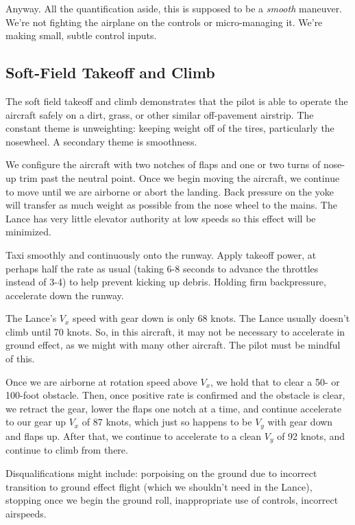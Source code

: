Anyway. All the quantification aside, this is supposed to be a \emph{smooth} maneuver. We're not fighting the airplane on the controls or micro-managing it. We're making small, subtle control inputs.

\subsection{Soft-Field Takeoff and Climb}

The soft field takeoff and climb demonstrates that the pilot is able to operate the aircraft safely on a dirt, grass, or other similar off-pavement airstrip. The constant theme is unweighting: keeping weight off of the tires, particularly the nosewheel. A secondary theme is smoothness.

We configure the aircraft with two notches of flaps and one or two turns of nose-up trim past the neutral point. Once we begin moving the aircraft, we continue to move until we are airborne or abort the landing. Back pressure on the yoke will transfer as much weight as possible from the nose wheel to the mains. The Lance has very little elevator authority at low speeds so this effect will be minimized.

Taxi smoothly and continuously onto the runway. Apply takeoff power, at perhaps half the rate as usual (taking 6-8 seconds to advance the throttles instead of 3-4) to help prevent kicking up debris. Holding firm backpressure, accelerate down the runway.

The Lance's $V_x$ speed with gear down is only 68 knots. The Lance usually doesn't climb until 70 knots. So, in this aircraft, it may not be necessary to accelerate in ground effect, as we might with many other aircraft. The pilot must be mindful of this.

Once we are airborne at rotation speed above $V_x$, we hold that to clear a 50- or 100-foot obstacle. Then, once positive rate is confirmed and the obstacle is clear, we retract the gear, lower the flaps one notch at a time, and continue accelerate to our gear up $V_x$ of 87 knots, which just so happens to be $V_y$ with gear down and flaps up. After that, we continue to accelerate to a clean $V_y$ of 92 knots, and continue to climb from there.

Disqualifications might include: porpoising on the ground due to incorrect transition to ground effect flight (which we shouldn't need in the Lance), stopping once we begin the ground roll, inappropriate use of controls, incorrect airspeeds.

